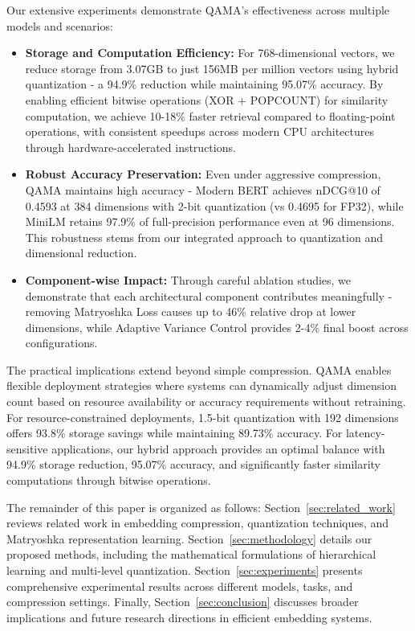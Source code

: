 Our extensive experiments demonstrate QAMA's effectiveness across multiple models and scenarios:

\begin{itemize}
    \item \textbf{Storage and Computation Efficiency:} For 768-dimensional vectors, we reduce storage from 3.07GB to just 156MB per million vectors using hybrid quantization - a 94.9\% reduction while maintaining 95.07\% accuracy. By enabling efficient bitwise operations (XOR + POPCOUNT) for similarity computation, we achieve 10-18\% faster retrieval compared to floating-point operations, with consistent speedups across modern CPU architectures through hardware-accelerated instructions.
    
    \item \textbf{Robust Accuracy Preservation:} Even under aggressive compression, QAMA maintains high accuracy - Modern BERT achieves nDCG@10 of 0.4593 at 384 dimensions with 2-bit quantization (vs 0.4695 for FP32), while MiniLM retains 97.9\% of full-precision performance even at 96 dimensions. This robustness stems from our integrated approach to quantization and dimensional reduction.
    
    \item \textbf{Component-wise Impact:} Through careful ablation studies, we demonstrate that each architectural component contributes meaningfully - removing Matryoshka Loss causes up to 46\% relative drop at lower dimensions, while Adaptive Variance Control provides 2-4\% final boost across configurations.
\end{itemize}

The practical implications extend beyond simple compression. QAMA enables flexible deployment strategies where systems can dynamically adjust dimension count based on resource availability or accuracy requirements without retraining. For resource-constrained deployments, 1.5-bit quantization with 192 dimensions offers 93.8\% storage savings while maintaining 89.73\% accuracy. For latency-sensitive applications, our hybrid approach provides an optimal balance with 94.9\% storage reduction, 95.07\% accuracy, and significantly faster similarity computations through bitwise operations.

The remainder of this paper is organized as follows: Section~\ref{sec:related_work} reviews related work in embedding compression, quantization techniques, and Matryoshka representation learning. Section~\ref{sec:methodology} details our proposed methods, including the mathematical formulations of hierarchical learning and multi-level quantization. Section~\ref{sec:experiments} presents comprehensive experimental results across different models, tasks, and compression settings. Finally, Section~\ref{sec:conclusion} discusses broader implications and future research directions in efficient embedding systems.



